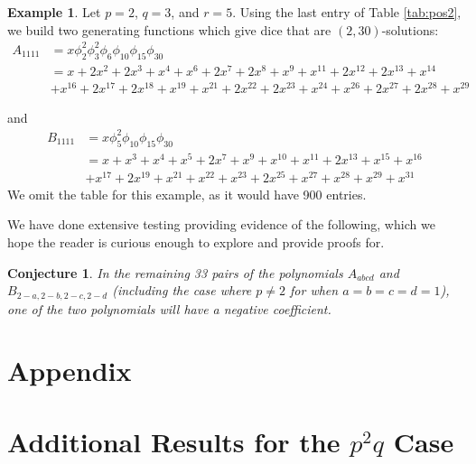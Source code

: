 \documentclass[11pt]{amsart}
\numberwithin{equation}{section}
\theoremstyle{plain}
\newtheorem{con}[equation]{Conjecture}
\theoremstyle{definition}
\newtheorem{example}[equation]{Example}
\begin{document}



\begin{example}
Let $p=2$, $q=3$, and $r=5$. Using the last entry of Table \ref{tab:pos2}, we build two generating functions which give dice that are $(2,30)$-solutions: 
\begin{align*}
A_{1111}&=x\phi_2^2\phi_3^2\phi_6\phi_{10}\phi_{15}\phi_{30}\\
&=x + 2 x^2 + 2 x^3 + x^4 + x^6 + 2 x^7 + 2 x^8 + x^9 + x^{11} + 2 x^{12} + 2 x^{13} + x^{14} \\ &+ x^{16} + 2 x^{17} + 2 x^{18} + x^{19}+ x^{21} + 2 x^{22} + 2 x^{23} + x^{24} + x^{26} + 2 x^{27} + 2 x^{28} + x^{29} 
\end{align*}

and 
\begin{align*}
B_{1111}&=x\phi_5^2\phi_{10}\phi_{15}\phi_{30}\\
&=x + x^3 + x^4 + x^5 + 2 x^7 + x^9 + x^{10} + x^{11} + 2 x^{13} + x^{15}+ x^{16} \\ 
&+ x^{17} + 2 x^{19} + x^{21} + x^{22} + x^{23} + 2 x^{25} + x^{27} + x^{28} + x^{29} + x^{31} 
\end{align*}
We omit the table for this example, as it would have 900 entries.
\end{example}

We have done extensive testing providing evidence of the following, which we hope the reader is curious enough to explore and provide proofs for.

\begin{con}\label{con:pqr}
In the remaining 33 pairs of the polynomials $A_{abcd}$ and $B_{2-a,2-b,2-c,2-d}$ (including the case where $p\neq 2$ for when $a=b=c=d=1$), one of the two polynomials will have a negative coefficient.
\end{con}





\section*{Appendix}

\appendix

\section{Additional Results for the $p^2q$ Case}\label{sec:ids}
\end{document}
